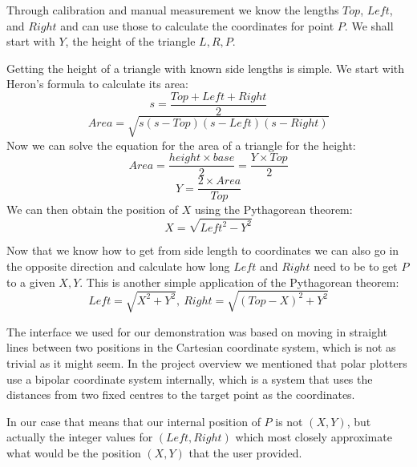 \documentclass[a4paper,10pt]{article}
\begin{document}
Through calibration and manual measurement we know the lengths $Top$,
$Left$, and $Right$ and can use those to calculate the coordinates
for point $P$.
We shall start with $Y$, the height of the triangle $L,R,P$.

Getting the height of a triangle with known side lengths is simple.
We start with Heron's formula to calculate its area:
$$s = \frac{Top + Left + Right}{2}$$
$$Area = \sqrt{s(s-Top)(s-Left)(s-Right)}$$
%
Now we can solve the equation for the area of a triangle for the height:
$$Area = \frac{height \times base}{2} = \frac{Y \times Top}{2}$$
$$Y = \frac{2 \times Area}{Top}$$
%
We can then obtain the position of $X$ using the Pythagorean theorem:
$$X = \sqrt{Left^2 - Y^2}$$

Now that we know how to get from side length to coordinates we can
also go in the opposite direction and calculate how long $Left$ and
$Right$ need to be to get $P$ to a given $X,Y$.
This is another simple application of the Pythagorean theorem:
$$Left = \sqrt{X^2 + Y^2},\ Right = \sqrt{(Top - X)^2 + Y^2}$$

The interface we used for our demonstration was based on moving
in straight lines between two positions in the Cartesian coordinate
system, which is not as trivial as it might seem.
In the project overview we mentioned that polar plotters use a
bipolar coordinate system internally, which is a system that uses
the distances from two fixed centres to the target point as the
coordinates.

In our case that means that our internal position of $P$ is not
$(X,Y)$, but actually the integer values for $(Left,Right)$
which most closely approximate what would be the position $(X,Y)$
that the user provided.


\end{document}
